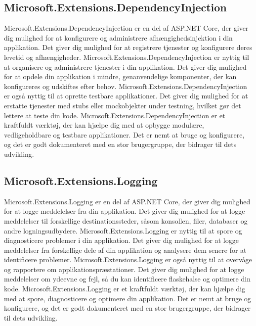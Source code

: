 \subsection{Microsoft.Extensions.DependencyInjection}
Microsoft.Extensions.DependencyInjection er en del af ASP.NET Core, der giver dig mulighed for at konfigurere og administrere afhængighedsinjektion i din applikation. Det giver dig mulighed for at registrere tjenester og konfigurere deres levetid og afhængigheder.
Microsoft.Extensions.DependencyInjection er nyttig til at organisere og administrere tjenester i din applikation. Det giver dig mulighed for at opdele din applikation i mindre, genanvendelige komponenter, der kan konfigureres og udskiftes efter behov.
Microsoft.Extensions.DependencyInjection er også nyttig til at oprette testbare applikationer. Det giver dig mulighed for at erstatte tjenester med stubs eller mockobjekter under testning, hvilket gør det lettere at teste din kode.
Microsoft.Extensions.DependencyInjection er et kraftfuldt værktøj, der kan hjælpe dig med at opbygge modulære, vedligeholdbare og testbare applikationer. Det er nemt at bruge og konfigurere, og det er godt dokumenteret med en stor brugergruppe, der bidrager til dets udvikling.

\subsection{Microsoft.Extensions.Logging}
Microsoft.Extensions.Logging er en del af ASP.NET Core, der giver dig mulighed for at logge meddelelser fra din applikation. Det giver dig mulighed for at logge meddelelser til forskellige destinationssteder, såsom konsollen, filer, databaser og andre logningsudbydere.
Microsoft.Extensions.Logging er nyttig til at spore og diagnosticere problemer i din applikation. Det giver dig mulighed for at logge meddelelser fra forskellige dele af din applikation og analysere dem senere for at identificere problemer.
Microsoft.Extensions.Logging er også nyttig til at overvåge og rapportere om applikationspræstationer. Det giver dig mulighed for at logge meddelelser om ydeevne og fejl, så du kan identificere flaskehalse og optimere din kode.
Microsoft.Extensions.Logging er et kraftfuldt værktøj, der kan hjælpe dig med at spore, diagnosticere og optimere din applikation. Det er nemt at bruge og konfigurere, og det er godt dokumenteret med en stor brugergruppe, der bidrager til dets udvikling.

